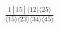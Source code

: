 \documentclass[varwidth, border=5pt]{standalone}
\begin{document}
\begin{my}
$\begin{gathered}
\scriptscriptstyle\frac{1[15]⟨12⟩⟨25⟩}{⟨15⟩⟨23⟩⟨34⟩⟨45⟩}
\end{gathered}$
\end{my}
\end{document}
